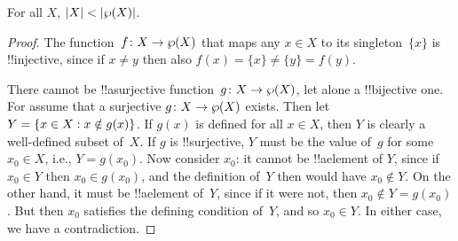 \documentclass[../../include/open-logic-section]{subfiles}
\begin{document}
\begin{thm}[Cantor]
For all $X$, $\left| X \right| < \left| \wp(X) \right|$.
\end{thm}

\begin{proof}
The function~$f \colon X \to \wp(X)$ that maps any $x \in X$ to its
singleton~$\{x\}$ is !!{injective}, since if $x \neq y$ then also $f(x) =
\{x\} \neq \{y\} = f(y)$.

There cannot be !!a{surjective} function~$g\colon X \to \wp(X)$, let
alone a !!{bijective} one. For assume that a surjective $g\colon X \to
\wp(X)$ exists.  Then let $Y = \{ x \in X : x \notin g(x) \}$. If
$g(x)$ is defined for all $x \in X$, then $Y$ is clearly a
well-defined subset of~$X$.  If $g$ is !!{surjective}, $Y$ must be the
value of~$g$ for some $x_0 \in X$, i.e., $Y = g(x_0)$.  Now consider
$x_0$: it cannot be !!a{element} of $Y$, since if $x_0 \in Y$ then
$x_0 \in g(x_0)$, and the definition of~$Y$ then would have $x_0
\notin Y$.  On the other hand, it must be !!a{element} of~$Y$, since
if it were not, then $x_0 \notin Y = g(x_0)$.  But then $x_0$
satisfies the defining condition of~$Y$, and so $x_0 \in Y$. In either
case, we have a contradiction.
\end{proof}
\end{document}
